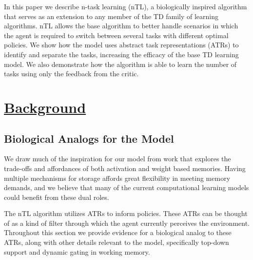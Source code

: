 \documentclass[10pt,letterpaper]{article}
\begin{document}

In this paper we describe n-task learning (nTL), a biologically inspired algorithm that serves as an extension to any member of the TD family of learning algorithms. nTL allows the base algorithm to better handle scenarios in which the agent is required to switch between several tasks with different optimal policies. We show how the model uses abstract task representations (ATRs) to identify and separate the tasks, increasing the efficacy of the base TD learning model. We also demonstrate how the algorithm is able to learn the number of tasks using only the feedback from the critic.

\section{\underline{Background}}

\subsection{Biological Analogs for the Model}

We draw much of the inspiration for our model from work that explores the trade-offs and affordances of both activation and weight based memories. Having multiple mechanisms for storage affords great flexibility in meeting memory demands, and we believe that many of the current computational learning models could benefit from these dual roles.

The nTL algorithm utilizes ATRs to inform policies. These ATRs can be thought of as a kind of filter through which the agent currently perceives the environment. Throughout this section we provide evidence for a biological analog to these ATRs, along with other details relevant to the model, specifically top-down support and dynamic gating in working memory.
\end{document}
